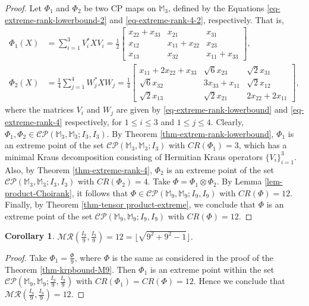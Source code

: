 \documentclass[10pt,reqno]{amsart}
\theoremstyle{definition}
\theoremstyle{plain}
\newtheorem{cor}[defn]{Corollary}
\theoremstyle{remark}
\newcommand{\mbb}[1]{\mathbb{#1}}
\newcommand{\msc}[1]{\mathscr{#1}}
\newcommand{\M}[1]{\mbb{M}_{#1}}%
\numberwithin{equation}{section}%
\begin{document}
\begin{proof}
	Let $\Phi_1$ and $\Phi_2$ be two CP maps on $\M{3}$, defined by the Equations \ref{eq-extreme-rank-lowerbound-2} and \ref{eq-extreme-rank-4-2}, respectively. That is,
	\begin{align*}
		\Phi_1(X) &= \sum_{i=1}^3 V_i^* X V_i = \frac{1}{2}\begin{bmatrix} 
			x_{22} + x_{33} & x_{21} & x_{31} \\
			x_{12} & x_{11} + x_{22} & x_{23} \\
			x_{13} & x_{32} & x_{11} + x_{33}
		\end{bmatrix}, \\
		\Phi_2(X) &= \frac{1}{4}\sum_{j=1}^4 W_j^* X W_j = \frac{1}{4}\begin{bmatrix}
			x_{11} + 2x_{22} + x_{33} & \sqrt{6}x_{23} & \sqrt{2}x_{31} \\
			\sqrt{6}x_{32} & 3x_{33} + x_{11} & \sqrt{2}x_{12} \\
			\sqrt{2}x_{13} & \sqrt{2}x_{21} & 2x_{22} + 2x_{11}
		\end{bmatrix},
	\end{align*}
	where the matrices $V_i$ and $W_j$ are given by \eqref{eq-extreme-rank-lowerbound} and \eqref{eq-extreme-rank-4} respectively, for  $1\leq i\leq 3$ and $1\leq j\leq 4$. Clearly, $\Phi_1,\Phi_2\in\msc{CP}(\M{3},\M{3}; I_{3},I_{3})$. By Theorem \ref{thm-extrem-rank-lowerbound}, $\Phi_1$ is an extreme point of the set $\msc{CP}(\M{3},\M{3}; I_{3})$ with $CR(\Phi_1)=3$, which has a minimal Kraus decomposition consisting of Hermitian Kraus operators $\{V_i\}_{i=1}^3$. Also, by Theorem \ref{thm-extreme-rank-4}, $\Phi_2$ is an extreme point of the set $\msc{CP}(\M{3},\M{3}; I_{3}, I_{3})$ with $CR(\Phi_2)=4$. Take $\Phi = \Phi_1 \otimes \Phi_2$. By Lemma \ref{lem-product-Choirank}, it follows that $\Phi\in\msc{CP}(\M{9},\M{9}; I_{9}, I_{9})$ with $CR(\Phi)=12$. Finally, by Theorem \ref{thm-tensor product-extreme}, we conclude that $\Phi$ is an extreme point of the set $\msc{CP}(\M{9},\M{9}; I_{9}, I_{9})$ with $CR(\Phi)=12$.
\end{proof}



\begin{cor}
	$\msc{MR}(\frac{I_{9}}{9},\frac{I_{9}}{9})= 12=\lfloor{\sqrt{9^2+9^2-1}}\rfloor$.
\end{cor}


\begin{proof}
	Take $\Phi_1=\frac{\Phi}{9}$, where $\Phi$ is the same as considered in the proof of the Theorem \ref{thm-krpbound-M9}. Then $\Phi_1$ is an extreme point within the set $\msc{CP}(\M{9},\M{9}; \frac{I_{9}}{9},\frac{I_{9}}{9})$ with $CR(\Phi_1)=CR(\Phi)=12$. Hence we conclude that $\msc{MR}(\frac{I_{9}}{9},\frac{I_{9}}{9})=12$.
\end{proof}
\end{document}
